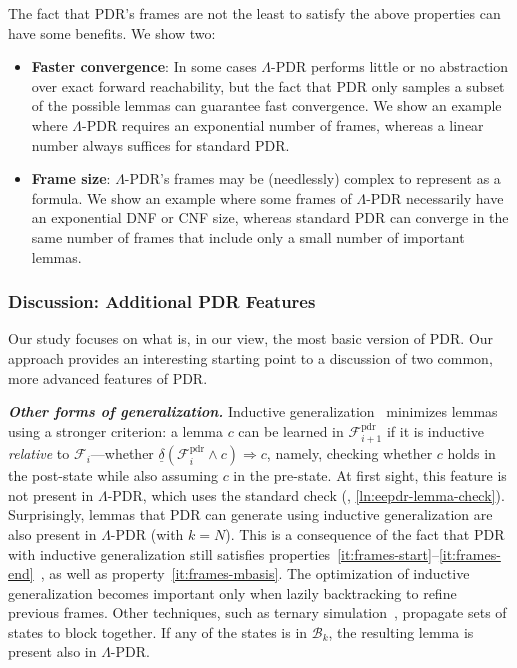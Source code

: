 \documentclass[acmsmall,screen]{acmart}
\newcommand{\para}[1]{\vspace{2pt}\noindent\textbf{\textit{#1.}}}
\renewcommand{\implies}{\Longrightarrow}
\newcommand{\tr}{\delta}
\newcommand{\Frame}{\mathcal{F}}
\newcommand{\Framepdr}{\mathcal{F}^{\text{pdr}}}
\newcommand{\reflextr}[1]{\underline{#1}}
\newcommand{\postimage}[2]{{\reflextr{#1}}({#2})}
\newcommand{\bkwrch}[1]{\mathcal{B}_{#1}}
\begin{document}
%
%

%
The fact that PDR's frames are not the least to satisfy the above properties can
%
%
%
%
have some benefits. We show two:
\begin{itemize}
	\item \textbf{Faster convergence}: In some cases $\Lambda$-PDR performs little or no abstraction over exact forward reachability, but the fact that PDR only samples a subset of the possible lemmas can guarantee fast convergence. We show an example where $\Lambda$-PDR requires an exponential number of frames, whereas a linear number always suffices for standard PDR.

	\item \textbf{Frame size}: $\Lambda$-PDR's frames may be (needlessly) complex to represent as a formula. We show an example where some frames of $\Lambda$-PDR necessarily have an exponential DNF or CNF size, whereas standard PDR can converge in the same number of frames that include only a small number of important lemmas.
\end{itemize}

\subsubsection{Discussion: Additional PDR Features}
Our study focuses on what is, in our view, the most basic version of PDR. Our approach provides an interesting starting point to a discussion of two common, more advanced features of PDR.

\para{Other forms of generalization}
\label{sec:overview-inductive-generalization}
Inductive generalization~\cite{ic3} minimizes lemmas using a stronger criterion:
a lemma $c$ can be learned in $\Framepdr_{i+1}$ if it is inductive \emph{relative} to $\Frame_i$---whether $\postimage{\tr}{\Framepdr_i \land c} \implies c$, namely, checking whether $c$ holds in the post-state while also assuming $c$ in the pre-state. At first sight, this feature is not present in $\Lambda$-PDR, which uses the standard check (, \cref{ln:eepdr-lemma-check}). Surprisingly, lemmas that PDR can generate using inductive generalization are also present in $\Lambda$-PDR (with $k=N$). This is a consequence of the fact that PDR with inductive generalization still satisfies properties~\ref{it:frames-start}--\ref{it:frames-end}~\cite{ic3,pdr}, as well as property~\ref{it:frames-mbasis}. The optimization of inductive generalization becomes important only when lazily backtracking to refine previous frames.
Other techniques, such as ternary simulation~\cite{pdr}, propagate sets of states to block together. If any of the states is in $\bkwrch{k}$, the resulting lemma is present also in $\Lambda$-PDR.
\end{document}

